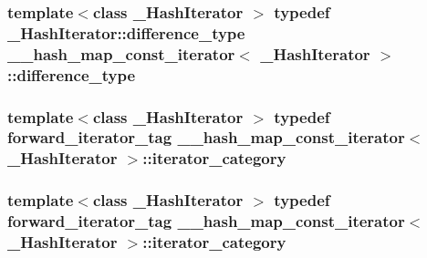\subsubsection[{difference\+\_\+type}]{\setlength{\rightskip}{0pt plus 5cm}template$<$class \+\_\+\+Hash\+Iterator $>$ typedef \+\_\+\+Hash\+Iterator\+::difference\+\_\+type {\bf \+\_\+\+\_\+hash\+\_\+map\+\_\+const\+\_\+iterator}$<$ \+\_\+\+Hash\+Iterator $>$\+::{\bf difference\+\_\+type}}\label{class____hash__map__const__iterator_abb62a6764e9e5be48b0704166bbb7aa0}
\hypertarget{class____hash__map__const__iterator_a0135bf4f02eedc8d20290718247ae331}{}
\subsubsection[{iterator\+\_\+category}]{\setlength{\rightskip}{0pt plus 5cm}template$<$class \+\_\+\+Hash\+Iterator $>$ typedef forward\+\_\+iterator\+\_\+tag {\bf \+\_\+\+\_\+hash\+\_\+map\+\_\+const\+\_\+iterator}$<$ \+\_\+\+Hash\+Iterator $>$\+::{\bf iterator\+\_\+category}}\label{class____hash__map__const__iterator_a0135bf4f02eedc8d20290718247ae331}
\hypertarget{class____hash__map__const__iterator_a0135bf4f02eedc8d20290718247ae331}{}
\subsubsection[{iterator\+\_\+category}]{\setlength{\rightskip}{0pt plus 5cm}template$<$class \+\_\+\+Hash\+Iterator $>$ typedef forward\+\_\+iterator\+\_\+tag {\bf \+\_\+\+\_\+hash\+\_\+map\+\_\+const\+\_\+iterator}$<$ \+\_\+\+Hash\+Iterator $>$\+::{\bf iterator\+\_\+category}}\label{class____hash__map__const__iterator_a0135bf4f02eedc8d20290718247ae331}
\hypertarget{class____hash__map__const__iterator_a4bb73ff2685ed4941c03a85bf4248e90}{}
